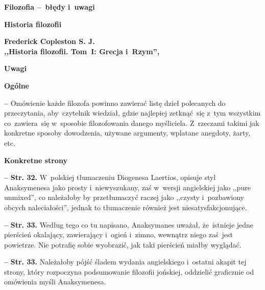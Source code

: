 \documentclass[a4paper,11pt]{article}
\newcommand{\spaceOne}{2em}
\newcommand{\spaceTwo}{1em}
\newcommand{\spaceThree}{0.25em}
\newcommand{\tb}{\textbf}
\newcommand{\noi}{\noindent}
\newcommand{\start}{\noi \tb{--} {}}
\newcommand{\Center}[1]{\begin{center} #1 \end{center}}
\newcommand{\CenterTB}[1]{\Center{\tb{#1}}}
\newcommand{\Str}[1]{\tb{Str. #1.}}
\newcommand{\Main}[1]{ \begin{center} {\LARGE \tb{#1} } \end{center} }
\newcommand{\Field}[1]{ \begin{center} {\Large \tb{#1} } \end{center} }
\newcommand{\Work}[1]{ \begin{center} {\large \tb{#1}} \end{center} }
\begin{document}
\Main{Filozofia --~błędy i~uwagi}

\vspace{\spaceOne}



\Field{Historia filozofii}



\Work{ Frederick Copleston S. J. \\
  ,,Historia filozofii. Tom~I: Grecja i~Rzym'', \cite{Cop04} }


\CenterTB{Uwagi}

\noi \tb{Ogólne}

\vspace{\spaceThree}

\start Omówienie każde filozofa powinno zawierać listę dzieł
polecanych do przeczytania, aby~czytelnik wiedział, gdzie najlepiej
zetknąć~się z~tym wszystkim co~zawiera~się w~sposobie filozofowania
danego myśliciela. Z~rzeczami takimi jak konkretne sposoby dowodzenia,
używane argumenty, wplatane anegdoty, żarty, etc.

\vspace{\spaceTwo}


\noi \tb{Konkretne strony}

\vspace{\spaceThree}

\start \Str{32} W~polskiej tłumaczeniu Diogenesa Laertios, opisuje
styl Anaksymenesa jako prosty i~niewyszukany, zaś w~wersji angielskiej
jako ,,pure unmixed'', co należałoby by przetłumaczyć raczej jako
,,czysty i~pozbawiony obcych naleciałości'', jednak to tłumaczenie
również jest niesatysfakcjonujące.

\start \Str{33} Według tego co tu napisano, Anaksymanes uważał,
że~istnieje jedne pierścień okalający, zawierający i~ogień i~zimno,
wewnątrz niego zaś~jest powietrze. Nie potrafię sobie wyobrazić, jak
taki pierścień miałby wyglądać.

\start \Str{33} Należałoby pójść śladem wydania angielskiego i~ostatni
akapit tej strony, który rozpoczyna podsumowanie filozofii jońskiej,
oddzielić graficznie od omówienia myśli Anaksymenesa.
\end{document}
